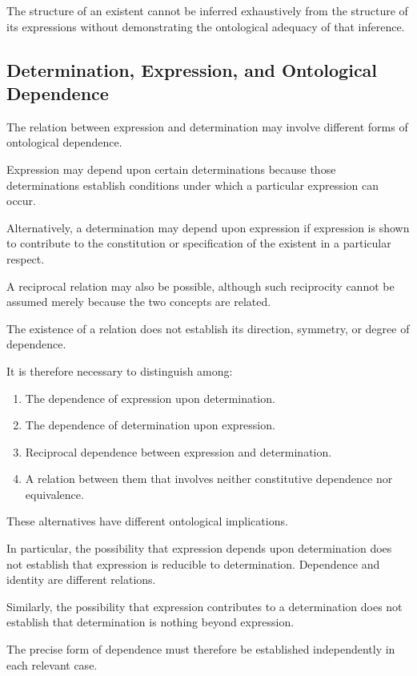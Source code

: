 The structure of an existent cannot be inferred
exhaustively from the structure of its expressions
without demonstrating the ontological adequacy
of that inference.

\subsection{Determination, Expression, and Ontological Dependence}

The relation between expression and determination
may involve different forms of ontological dependence.

Expression may depend upon certain determinations
because those determinations establish conditions
under which a particular expression can occur.

Alternatively, a determination may depend upon
expression if expression is shown to contribute
to the constitution or specification of the existent
in a particular respect.

A reciprocal relation may also be possible, although
such reciprocity cannot be assumed merely because
the two concepts are related.

The existence of a relation does not establish
its direction, symmetry, or degree of dependence.

It is therefore necessary to distinguish among:

\begin{enumerate}
    \item The dependence of expression upon determination.
    \item The dependence of determination upon expression.
    \item Reciprocal dependence between expression
    and determination.
    \item A relation between them that involves
    neither constitutive dependence nor equivalence.
\end{enumerate}

These alternatives have different ontological
implications.

In particular, the possibility that expression
depends upon determination does not establish
that expression is reducible to determination.
Dependence and identity are different relations.

Similarly, the possibility that expression contributes
to a determination does not establish that determination
is nothing beyond expression.

The precise form of dependence must therefore
be established independently in each relevant case.

